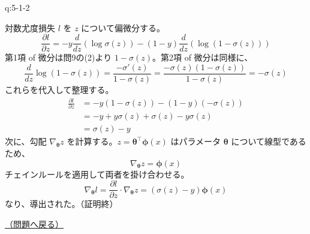\begin{answerbox}[phantomlabel=a:5-1-2]{q:5-1-2}

対数尤度損失 \(l\) を \(z\) について偏微分する。 \[
\frac{\partial l}{\partial z} = -y \frac{d}{dz}(\log \sigma(z)) - (1-y) \frac{d}{dz}(\log(1 - \sigma(z)))
\] 第1項 of 微分は問9の(2)より \(1 - \sigma(z)\)。第2項 of
微分は同様に、 \[
\frac{d}{dz} \log(1 - \sigma(z)) = \frac{-\sigma'(z)}{1 - \sigma(z)} = \frac{-\sigma(z)(1 - \sigma(z))}{1 - \sigma(z)} = -\sigma(z)
\] これらを代入して整理する。 \begin{align*}
\frac{\partial l}{\partial z} &= -y(1 - \sigma(z)) - (1-y)(-\sigma(z)) \\
&= -y + y\sigma(z) + \sigma(z) - y\sigma(z) \\
&= \sigma(z) - y
\end{align*} 次に、勾配 \(\nabla_{\boldsymbol{\theta}} z\)
を計算する。\(z = \boldsymbol{\theta}^\top \boldsymbol{\phi}(x)\)
はパラメータ \(\boldsymbol{\theta}\) について線型であるため、 \[
\nabla_{\boldsymbol{\theta}} z = \boldsymbol{\phi}(x)
\] チェインルールを適用して両者を掛け合わせる。 \[
\nabla_{\boldsymbol{\theta}} l = \frac{\partial l}{\partial z} \cdot \nabla_{\boldsymbol{\theta}} z = (\sigma(z) - y)\boldsymbol{\phi}(x)
\] なり、導出された。（証明終）

\hfill 

\hyperref[q:5-1-2]{（問題へ戻る）}

\end{answerbox}
